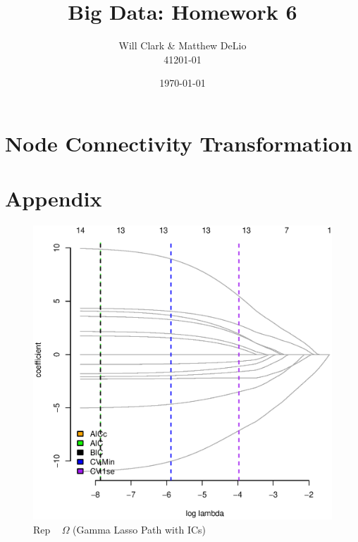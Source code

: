\documentclass[11pt, fleqn]{article}
\begin{document}
\title{Big Data: Homework 6}
\author{Will Clark \& Matthew DeLio \\ 41201-01}
\date{\today}
\maketitle

\section{Node Connectivity Transformation}

\section{Appendix}





\begin{figure}[!htb]
  \centering
  \includegraphics[scale=.5]{tpcs_rep.eps}
  \caption{Rep ~ $\Omega$ (Gamma Lasso Path with ICs)}
  \label{fig:}
\end{figure}



\end{document}
